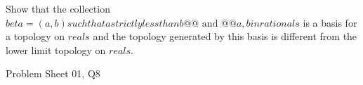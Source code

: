 \begin{samepage}
\begin{ex}
Show that the collection $beta = {{ (a,b) such that a strictly less than b @@\text{ and }@@ a, b in rationals }}$ is a basis for a topology on $reals$ and the topology generated by this basis is different from the lower limit topology on $reals$.
\end{ex}
\begin{source}
Problem Sheet 01, Q8
\end{source}
\end{samepage}

